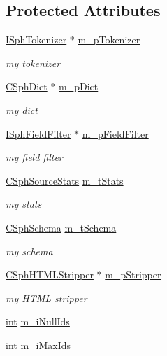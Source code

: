 \subsection*{Protected Attributes}
\begin{DoxyCompactItemize}
\item 
\hyperlink{classISphTokenizer}{I\-Sph\-Tokenizer} $\ast$ \hyperlink{classCSphSource_a4fdb1d9e18e1db8b02d616d0a29c5153}{m\-\_\-p\-Tokenizer}
\begin{DoxyCompactList}\small\item\em my tokenizer \end{DoxyCompactList}\item 
\hyperlink{classCSphDict}{C\-Sph\-Dict} $\ast$ \hyperlink{classCSphSource_a4ac924707004945af25424567105a7e8}{m\-\_\-p\-Dict}
\begin{DoxyCompactList}\small\item\em my dict \end{DoxyCompactList}\item 
\hyperlink{classISphFieldFilter}{I\-Sph\-Field\-Filter} $\ast$ \hyperlink{classCSphSource_a0aba586db1c01324f1271b5caa739bcd}{m\-\_\-p\-Field\-Filter}
\begin{DoxyCompactList}\small\item\em my field filter \end{DoxyCompactList}\item 
\hyperlink{structCSphSourceStats}{C\-Sph\-Source\-Stats} \hyperlink{classCSphSource_aab2f058ba7edd25fccb64d3352cdc513}{m\-\_\-t\-Stats}
\begin{DoxyCompactList}\small\item\em my stats \end{DoxyCompactList}\item 
\hyperlink{classCSphSchema}{C\-Sph\-Schema} \hyperlink{classCSphSource_a3f565a200e543bd96724d53f9756b510}{m\-\_\-t\-Schema}
\begin{DoxyCompactList}\small\item\em my schema \end{DoxyCompactList}\item 
\hyperlink{classCSphHTMLStripper}{C\-Sph\-H\-T\-M\-L\-Stripper} $\ast$ \hyperlink{classCSphSource_aeca4a701b62373de45bfa69f5e5a4817}{m\-\_\-p\-Stripper}
\begin{DoxyCompactList}\small\item\em my H\-T\-M\-L stripper \end{DoxyCompactList}\item 
\hyperlink{sphinxexpr_8cpp_a4a26e8f9cb8b736e0c4cbf4d16de985e}{int} \hyperlink{classCSphSource_a667ff9e98ab9a219f7e49faf2e94b887}{m\-\_\-i\-Null\-Ids}
\item 
\hyperlink{sphinxexpr_8cpp_a4a26e8f9cb8b736e0c4cbf4d16de985e}{int} \hyperlink{classCSphSource_ac05e31f4dc3b344d46ef7417ded093b8}{m\-\_\-i\-Max\-Ids}
\end{DoxyCompactItemize}



